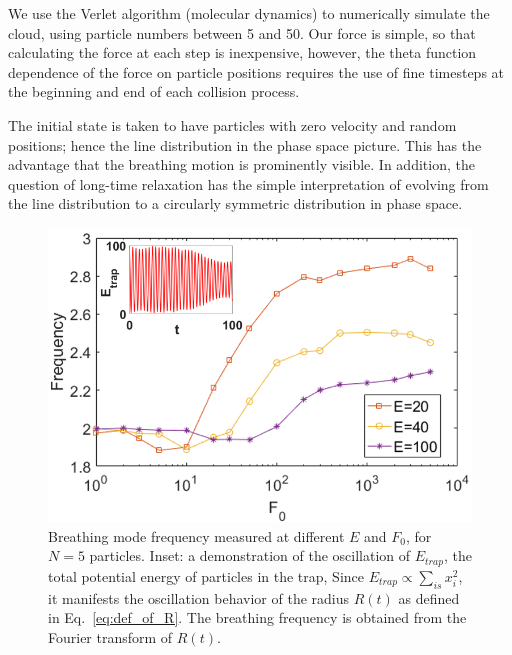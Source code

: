 \documentclass[a4paper, onecolumn]{revtex4-1}
\begin{document}
We use the Verlet algorithm (molecular dynamics) to numerically simulate the cloud, using particle
numbers between 5 and 50.  Our force is simple, so that calculating the force at each step is
inexpensive, however, the theta function dependence of the force on particle positions requires the
use of fine timesteps at the beginning and end of each collision process.

The initial state is taken to have particles with zero velocity and random positions; hence the line
distribution in the phase space picture.  This has the advantage that the breathing motion is
prominently visible.  In addition, the question of long-time relaxation has the simple
interpretation of evolving from the line distribution to a circularly symmetric distribution in
phase space.





\begin{figure}[tbp]
\center
\includegraphics[scale=0.32]{ZhiyuPictures/freq_scanF_differentE_log_2_with_oscillation_demo.png}
\caption{Breathing mode frequency measured at different $E$ and $F_0$, for $N=5$ particles. Inset: a
  demonstration of the oscillation of $E_{trap}$, the total potential energy of particles in the
  trap, Since $E_{trap}\propto \sum_{is}{x_i^2}$, it manifests the oscillation behavior of the
  radius $R(t)$ as defined in Eq.~\ref{eq:def_of_R}.  The breathing frequency is obtained from the
  Fourier transform of $R(t)$.}
\label{fig:Breathingfrequency1}
\end{figure}
\end{document}
